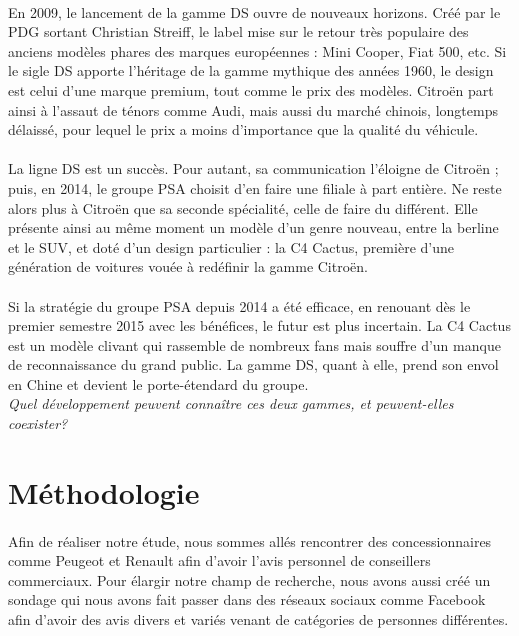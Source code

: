 \documentclass[12pt]{article}\usepackage[]{graphicx}\usepackage[]{color}
\begin{document}
\paragraph{} En 2009, le lancement de la gamme DS ouvre de nouveaux horizons.
Créé par le PDG sortant Christian Streiff, le label mise sur le retour très
populaire des anciens modèles phares des marques européennes : Mini Cooper,
Fiat 500, etc. Si le sigle DS apporte l'héritage de la gamme mythique des
années 1960, le design est celui d'une marque premium, tout comme le prix des
modèles. Citroën part ainsi à l'assaut de ténors comme Audi, mais aussi du
marché chinois, longtemps délaissé, pour lequel le prix a moins d'importance
que la qualité du véhicule.

\paragraph{} La ligne DS est un succès. Pour autant, sa communication l'éloigne
de Citroën ; puis, en 2014, le groupe PSA choisit d'en faire une filiale à part
entière. Ne reste alors plus à Citroën que sa seconde spécialité, celle de
faire du différent. Elle présente ainsi au même moment un modèle d'un genre
nouveau, entre la berline et le SUV, et doté d'un design particulier : la C4
Cactus, première d'une génération de voitures vouée à redéfinir la gamme
Citroën.

\paragraph{} Si la stratégie du groupe PSA depuis 2014 a été efficace, en
renouant dès le premier semestre 2015 avec les bénéfices\cite{lesechos}, le
futur est plus incertain. La C4 Cactus est un modèle clivant qui rassemble de
nombreux fans mais souffre d'un manque de reconnaissance du grand public. La
gamme DS, quant à elle, prend son envol en Chine et devient le porte-étendard
du groupe.\\

\noindent \emph{Quel développement peuvent connaître ces deux gammes, et
	peuvent-elles coexister?}

\break
\section{Méthodologie}

\paragraph{} Afin de réaliser notre étude, nous sommes allés rencontrer des
concessionnaires comme Peugeot et Renault afin d'avoir l'avis personnel de
conseillers commerciaux. Pour élargir notre champ de recherche, nous avons
aussi créé un sondage qui nous avons fait passer dans des réseaux sociaux comme
Facebook afin d'avoir des avis divers et variés venant de catégories de
personnes différentes.
\end{document}
